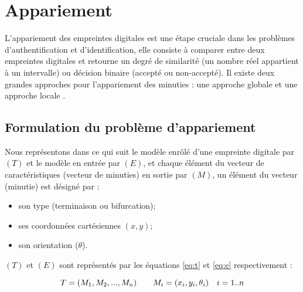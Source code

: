 \section{Appariement}
L'appariement des empreintes digitales est une étape cruciale dans les problèmes d'authentification et d'identification, elle consiste à comparer entre deux empreintes digitales et retourne un degré de similarité (un nombre réel appartient à un intervalle) ou décision binaire (accepté ou non-accepté). Il existe deux grandes approches pour l'appariement des minuties : une approche globale et une approche locale \citep{maltoni2009handbook}.

\subsection{Formulation du problème d'appariement}
Nous représentons dans ce qui suit le modèle enrôlé d'une empreinte digitale par $ (T) $ et le modèle en entrée par $ (E) $, et chaque élément du vecteur de caractéristiques (vecteur de minuties) en sortie par $ (M) $, un élément du vecteur (minutie) est désigné par : 
\begin{itemize}
	\item son type (terminaison ou bifurcation);
	\item ses coordonnées cartésiennes $ (x, y) $;
	\item son orientation ($\theta$).
\end{itemize}
	$ (T) $ et $ (E) $ sont représentés par les équations \ref{eq:t} et \ref{eq:e} respectivement : 
\begin{center}
	\begin{equation}\label{eq:t}
	\abovedisplayskip
	\belowdisplayskip
	T=(M_{1},M_{2}, ..., M_{n})\qquad M_{i}=(x_{i},y_{i},\theta_{i})\quad i = 1 .. n
	\end{equation}
\end{center}

